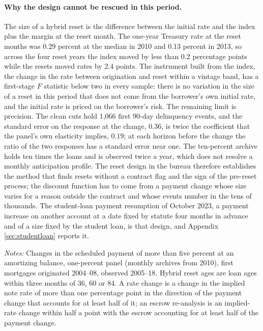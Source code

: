 \paragraph{Why the design cannot be rescued in this period.} The size of a hybrid reset is the difference between the initial rate and the index plus the margin at the reset month. The one-year Treasury rate at the reset months was 0.29 percent at the median in 2010 and 0.13 percent in 2013, so across the four reset years the index moved by less than 0.2 percentage points while the resets moved rates by 2.4 points. The instrument built from the index, the change in the rate between origination and reset within a vintage band, has a first-stage $F$ statistic below two in every sample: there is no variation in the size of a reset in this period that does not come from the borrower's own initial rate, and the initial rate is priced on the borrower's risk. The remaining limit is precision. The clean cuts hold 1,066 first 90-day delinquency events, and the standard error on the response at the change, $0.36$, is twice the coefficient that the panel's own elasticity implies, $0.19$; at each horizon before the change the ratio of the two responses has a standard error near one. The ten-percent archive holds ten times the loans and is observed twice a year, which does not resolve a monthly anticipation profile. The reset design in the bureau therefore establishes the method that finds resets without a contract flag and the sign of the pre-reset process; the discount function has to come from a payment change whose size varies for a reason outside the contract and whose events number in the tens of thousands. The student-loan payment resumption of October 2023, a payment increase on another account at a date fixed by statute four months in advance and of a size fixed by the student loan, is that design, and Appendix \ref{sec:studentloan} reports it.

\begin{table}[H]
\centering
\caption{Payment changes on 2004--08 first mortgages, classified by the balance path}
\label{tab:arm_classes}
\small
\resizebox{\textwidth}{!}{}
\vspace{0.5em}
\begin{minipage}{0.92\textwidth}
\noindent \small \textit{Notes:} Changes in the scheduled payment of more than five percent at an amortizing balance, one-percent panel (monthly archives from 2010), first mortgages originated 2004--08, observed 2005--18. Hybrid reset ages are loan ages within three months of 36, 60 or 84. A rate change is a change in the implied note rate of more than one percentage point in the direction of the payment change that accounts for at least half of it; an escrow re-analysis is an implied-rate change within half a point with the escrow accounting for at least half of the payment change.
\end{minipage}
\end{table}

